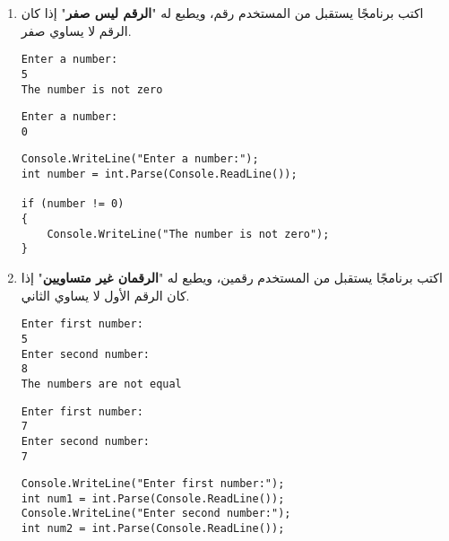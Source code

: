 ﻿\documentclass[12pt]{article}
\begin{document}
\begin{enumerate}[itemsep=3em]
\begin{enumerate}
\item
اكتب برنامجًا يستقبل من المستخدم رقم، ويطبع له "\textbf{الرقم ليس صفر}" إذا كان الرقم لا يساوي صفر.
\ifdetailed
\begin{boxExample}[1]
\begin{english}
\begin{verbatim}
Enter a number:
5
The number is not zero
\end{verbatim}
\end{english}
\end{boxExample}
\begin{boxExample}[2]
\begin{english}
\begin{verbatim}
Enter a number:
0
\end{verbatim}
\end{english}
\end{boxExample}

\ifwithsols
\begin{boxSolution}
\begin{english}
\begin{verbatim}
Console.WriteLine("Enter a number:");
int number = int.Parse(Console.ReadLine());

if (number != 0)
{
    Console.WriteLine("The number is not zero");
}
\end{verbatim}
\end{english}
\end{boxSolution}
\clearpage
\fi
\fi

\item
اكتب برنامجًا يستقبل من المستخدم رقمين، ويطبع له "\textbf{الرقمان غير متساويين}" إذا كان الرقم الأول لا يساوي الثاني.
\ifdetailed
\begin{boxExample}[1]
\begin{english}
\begin{verbatim}
Enter first number:
5
Enter second number:
8
The numbers are not equal
\end{verbatim}
\end{english}
\end{boxExample}
\begin{boxExample}[2]
\begin{english}
\begin{verbatim}
Enter first number:
7
Enter second number:
7
\end{verbatim}
\end{english}
\end{boxExample}

\ifwithsols
\begin{boxSolution}
\begin{english}
\begin{verbatim}
Console.WriteLine("Enter first number:");
int num1 = int.Parse(Console.ReadLine());
Console.WriteLine("Enter second number:");
int num2 = int.Parse(Console.ReadLine());


\end{verbatim}
\end{english}
\end{boxSolution}
\end{enumerate}
\end{enumerate}
\end{document}
